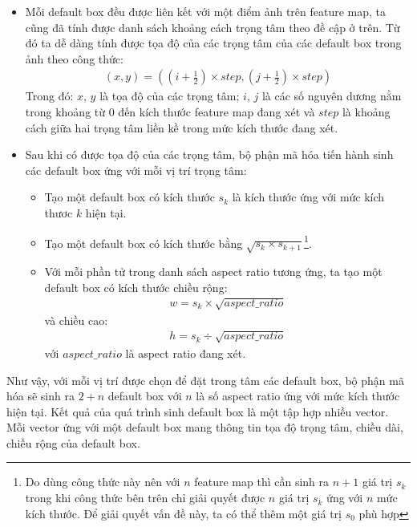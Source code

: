 \documentclass[a4paper,12pt]{article}
\begin{document}
	\begin{itemize}
		
		\item Mỗi default box đều được liên kết với một điểm ảnh trên feature map, ta cũng đã tính được danh sách khoảng cách trọng tâm theo đề cập ở trên. Từ đó ta dễ dàng tính được tọa độ của các trọng tâm của các default box trong ảnh theo công thức:
		\begin{align}
		(x, y) =\left( \left(i + \frac{1}{2} \right) \times step, \left(j + \frac{1}{2} \right) \times step \right)
		\end{align}
		Trong đó: $x$, $y$ là tọa độ của các trọng tâm; $i$, $j$ là các số nguyên dương nằm trong khoảng từ 0 đến kích thước feature map đang xét và $step$ là khoảng cách giữa hai trọng tâm liền kề trong mức kích thước đang xét.
		
		\item Sau khi có được tọa độ của các trọng tâm, bộ phận mã hóa tiến hành sinh các default box ứng với mỗi vị trí trọng tâm: 
		
		\begin{itemize}
			\item Tạo một default box có kích thước $s_k$ là kích thước ứng với mức kích thươc $k$ hiện tại.
			\item Tạo một default box có kích thước bằng $\sqrt{s_k \times s_{k + 1}}$\footnote{Do dùng công thức này nên với $n$ feature map thì cần sinh ra $n + 1$ giá trị $s_k$ trong khi công thức bên trên chỉ giải quyết được $n$ giá trị $s_k$ ứng với $n$ mức kích thước. Để giải quyết vấn đề này, ta có thể thêm một giá trị $s_0$ phù hợp}.
			\item Với mỗi phần tử trong danh sách aspect ratio tương ứng, ta tạo một default box có kích thước chiều rộng: 
			\begin{align}
			w = s_k \times \sqrt{aspect\_ratio}
			\end{align} 
			và chiều cao:
			\begin{align}
			h = s_k \div \sqrt{aspect\_ratio}
			\end{align}
			với $aspect\_ratio$ là aspect ratio đang xét.
		\end{itemize}
		
	\end{itemize}
	
	Như vậy, với mỗi vị trí được chọn để đặt trong tâm các default box, bộ phận mã hóa sẽ sinh ra $2 + n$ default box với $n$ là số aspect ratio ứng với mức kích thước hiện tại. Kết quả của quá trình sinh default box là một tập hợp nhiều vector. Mỗi vector ứng với một default box mang thông tin tọa độ trọng tâm, chiều dài, chiều rộng của default box.
	
\end{document}
